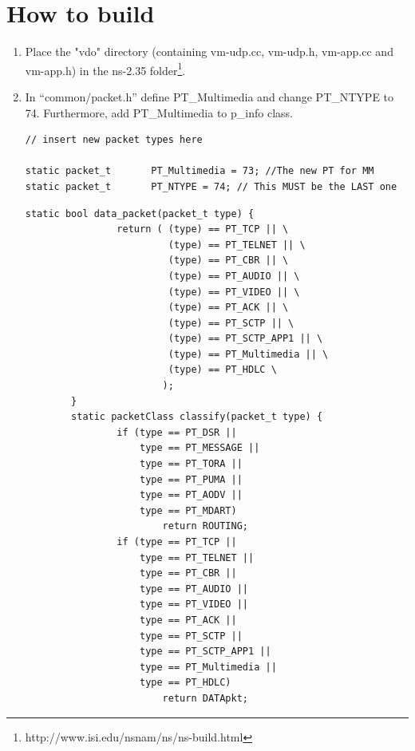 \documentclass[11pt]{article} %
\begin{document}
\section{How to build}

\begin{enumerate}
	\item Place the "vdo" directory  (containing vm-udp.cc, vm-udp.h, vm-app.cc and vm-app.h) in the ns-2.35 folder\footnote{http://www.isi.edu/nsnam/ns/ns-build.html}. 

	\item In “common/packet.h” define PT\_Multimedia and change PT\_NTYPE to 74. Furthermore, add PT\_Multimedia to p\_info class. 

\begin{lstlisting}[title="packet.h"]
        // insert new packet types here

static packet_t       PT_Multimedia = 73; //The new PT for MM
static packet_t       PT_NTYPE = 74; // This MUST be the LAST one
\end{lstlisting}

\begin{lstlisting}[title="packet.h"]
        static bool data_packet(packet_t type) {
                return ( (type) == PT_TCP || \
                         (type) == PT_TELNET || \
                         (type) == PT_CBR || \
                         (type) == PT_AUDIO || \
                         (type) == PT_VIDEO || \
                         (type) == PT_ACK || \
                         (type) == PT_SCTP || \
                         (type) == PT_SCTP_APP1 || \
                         (type) == PT_Multimedia || \
                         (type) == PT_HDLC \
                        );
        }
        static packetClass classify(packet_t type) {            
                if (type == PT_DSR || 
                    type == PT_MESSAGE || 
                    type == PT_TORA ||
                    type == PT_PUMA ||
                    type == PT_AODV ||
                    type == PT_MDART)
                        return ROUTING;         
                if (type == PT_TCP || 
                    type == PT_TELNET || 
                    type == PT_CBR || 
                    type == PT_AUDIO || 
                    type == PT_VIDEO || 
                    type == PT_ACK || 
                    type == PT_SCTP || 
                    type == PT_SCTP_APP1 || 
                    type == PT_Multimedia || 
                    type == PT_HDLC)
                        return DATApkt;
\end{lstlisting}



\end{enumerate}
\end{document}
